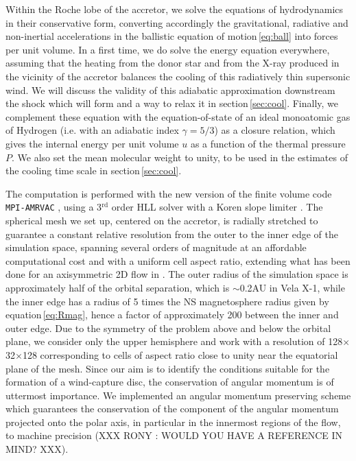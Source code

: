 \documentclass{aa}
\makeatletter
\newcommand*{\ns}{NS\@\xspace}
\newcommand*{\ie}{i.e.\@\xspace}
\makeatother
\begin{document}
Within the Roche lobe of the accretor, we solve the equations of hydrodynamics in their conservative form, converting accordingly the gravitational, radiative and non-inertial accelerations in the ballistic equation of motion\,\eqref{eq:ball} into forces per unit volume. In a first time, we do solve the energy equation everywhere, assuming that the heating from the donor star and from the X-ray produced in the vicinity of the accretor balances the cooling of this radiatively thin supersonic wind. We will discuss the validity of this adiabatic approximation downstream the shock which will form and a way to relax it in section\,\ref{sec:cool}. Finally, we complement these equation with the equation-of-state of an ideal monoatomic gas of Hydrogen (\ie with an adiabatic index $\gamma=5/3$) as a closure relation, which gives the internal energy per unit volume $u$ as a function of the thermal pressure $P$. We also set the mean molecular weight to unity, to be used in the estimates of the cooling time scale in section\,\ref{sec:cool}.

The computation is performed with the new version of the finite volume code \texttt{MPI-AMRVAC} \citep{Xia2017}, using a 3$^{\text{rd}}$ order HLL solver \citep{Toro1994} with a Koren slope limiter \citep{Vreugdenhil1993}. The spherical mesh we set up, centered on the accretor, is radially stretched to guarantee a constant relative resolution from the outer to the inner edge of the simulation space, spanning several orders of magnitude at an affordable computational cost and with a uniform cell aspect ratio, extending what has been done for an axisymmetric 2D flow in \cite{ElMellah2015}. The outer radius of the simulation space is approximately half of the orbital separation, which is $\sim$0.2AU in Vela X-1, while the inner edge has a radius of 5 times the \ns magnetosphere radius given by equation\,\eqref{eq:Rmag}, hence a factor of approximately 200 between the inner and outer edge. Due to the symmetry of the problem above and below the orbital plane, we consider only the upper hemisphere and work with a resolution of 128$\times$32$\times$128 corresponding to cells of aspect ratio close to unity near the equatorial plane of the mesh. Since our aim is to identify the conditions suitable for the formation of a wind-capture disc, the conservation of angular momentum is of uttermost importance. We implemented an angular momentum preserving scheme which guarantees the conservation of the component of the angular momentum projected onto the polar axis, in particular in the innermost regions of the flow, to machine precision (XXX RONY : WOULD YOU HAVE A REFERENCE IN MIND? XXX).
\end{document}
